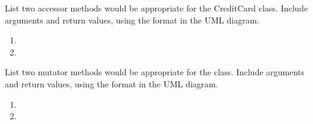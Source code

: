 \Q List two accessor methods would be appropriate for the CreditCard class.
Include arguments and return values, using the format in the UML diagram.

\begin{enumerate}
\item 
\item 
\end{enumerate}


\Q List two mutator methods would be appropriate for the  class.
Include arguments and return values, using the format in the UML diagram.

\begin{enumerate}
\item 
\item 
\end{enumerate}
